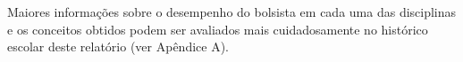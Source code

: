 Maiores informações sobre o desempenho do bolsista em cada uma das disciplinas e os conceitos obtidos podem ser avaliados mais cuidadosamente no histórico escolar deste relatório (ver Apêndice A).

